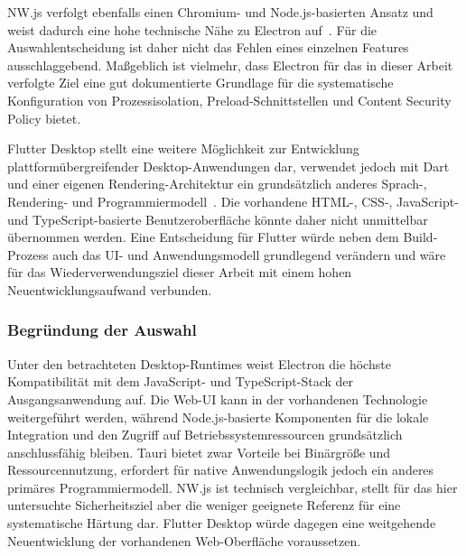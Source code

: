 NW.js verfolgt ebenfalls einen Chromium- und Node.js-basierten Ansatz und weist dadurch eine hohe technische Nähe zu Electron auf~\cite{nwjs2026docs}.
Für die Auswahlentscheidung ist daher nicht das Fehlen eines einzelnen Features ausschlaggebend.
Maßgeblich ist vielmehr, dass Electron für das in dieser Arbeit verfolgte Ziel eine gut dokumentierte Grundlage für die systematische Konfiguration von Prozessisolation, Preload-Schnittstellen und Content Security Policy bietet.

Flutter Desktop stellt eine weitere Möglichkeit zur Entwicklung plattformübergreifender Desktop-Anwendungen dar, verwendet jedoch mit Dart und einer eigenen Rendering-Architektur ein grundsätzlich anderes Sprach-, Rendering- und Programmiermodell~\cite{flutter2026docs}.
Die vorhandene HTML-, CSS-, JavaScript- und TypeScript-basierte Benutzeroberfläche könnte daher nicht unmittelbar übernommen werden.
Eine Entscheidung für Flutter würde neben dem Build-Prozess auch das UI- und Anwendungsmodell grundlegend verändern und wäre für das Wiederverwendungsziel dieser Arbeit mit einem hohen Neuentwicklungsaufwand verbunden.

\subsubsection{Begründung der Auswahl}
Unter den betrachteten Desktop-Runtimes weist Electron die höchste Kompatibilität mit dem JavaScript- und TypeScript-Stack der Ausgangsanwendung auf.
Die Web-UI kann in der vorhandenen Technologie weitergeführt werden, während Node.js-basierte Komponenten für die lokale Integration und den Zugriff auf Betriebssystemressourcen grundsätzlich anschlussfähig bleiben.
Tauri bietet zwar Vorteile bei Binärgröße und Ressourcennutzung, erfordert für native Anwendungslogik jedoch ein anderes primäres Programmiermodell.
NW.js ist technisch vergleichbar, stellt für das hier untersuchte Sicherheitsziel aber die weniger geeignete Referenz für eine systematische Härtung dar.
Flutter Desktop würde dagegen eine weitgehende Neuentwicklung der vorhandenen Web-Oberfläche voraussetzen.

